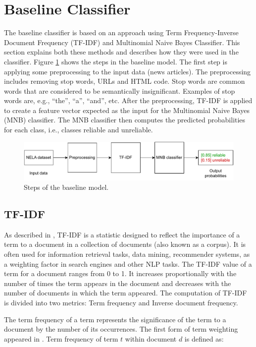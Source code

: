 \section{Baseline Classifier}
\label{baseline}
The baseline classifier is based on an approach using Term Frequency-Inverse Document Frequency (TF-IDF) and Multinomial Naive Bayes Classifier. This section explains both these methods and describes how they were used in the classifier. Figure \ref{fig:baseline_model} shows the steps in the baseline model. The first step is applying some preprocessing to the input data (news articles). The preprocessing includes removing stop words, URLs and HTML code. Stop words are common words that are considered to be semantically insignificant. Examples of stop words are, e.g., “the”, “a”, “and”, etc. After the preprocessing, TF-IDF is applied to create a feature vector expected as the input for the Multinomial Naive Bayes (MNB) classifier. The MNB classifier then computes the predicted probabilities for each class, i.e., classes reliable and unreliable.

\begin{figure}[H]
    \centering
    \includegraphics[scale=0.8]{obrazky-figures/baseline_model2.pdf}
    \caption{Steps of the baseline model.}
    \label{fig:baseline_model}
\end{figure}


\subsection*{TF-IDF}
As described in \cite{tf-idf}, TF-IDF is a statistic designed to reflect the importance of a term to a document in a collection of documents (also known as a corpus). It is often used for information retrieval tasks, data mining, recommender systems, as a weighting factor in search engines and other NLP tasks.
The TF-IDF value of a term for a document ranges from 0 to 1. It increases proportionally with the number of times the term appears in the document and decreases with the number of documents in which the term appeared. The computation of TF-IDF is divided into two metrics: Term frequency and Inverse document frequency.

The term frequency of a term represents the significance of the term to a document by the number of its occurrences. The first form of term weighting appeared in \cite{tf}. Term frequency of term $t$ within document $d$ is defined as:

